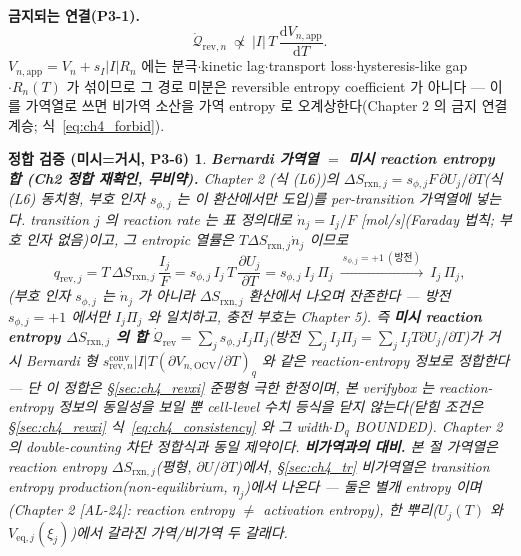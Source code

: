 \documentclass[11pt,a4paper]{article}
\newtheorem*{verifybox}{정합 검증 (미시=거시, P3-6)}
\newcommand{\dd}{\mathrm{d}}
\newcommand{\eq}{\mathrm{eq}}
\newcommand{\app}{\mathrm{app}}
\newcommand{\OCV}{\mathrm{OCV}}
\newcommand{\rev}{\mathrm{rev}}
\newcommand{\rxn}{\mathrm{rxn}}
\newcommand{\conv}{\mathrm{conv}}
\newcommand{\AL}[1]{\textsf{[AL-#1]}}
\begin{document}
\textbf{금지되는 연결(P3-1).}
\begin{equation}
\dot{\mathcal Q}_{\rev,n}\ \not\propto\ |I|\,T\,\frac{\dd V_{n,\app}}{\dd T}.
\label{eq:ch4_forbid}
\end{equation}
$V_{n,\app}=V_n+s_I|I|R_n$ 에는 분극$\cdot$kinetic lag$\cdot$transport loss$\cdot$hysteresis-like gap$\cdot R_n(T)$
가 섞이므로 그 경로 미분은 reversible entropy coefficient 가 아니다 — 이를 가역열로 쓰면 비가역 소산을 가역
entropy 로 오계상한다(Chapter 2 의 금지 연결 계승; 식~\eqref{eq:ch4_forbid}).

\begin{verifybox}
\textbf{Bernardi 가역열 $=$ 미시 reaction entropy 합 (Ch2 정합 재확인, 무비약).} Chapter 2 (식 (L6))의
$\Delta S_{\rxn,j}=s_{\phi,j}F\,\partial U_j/\partial T$(식 (L6) 동치형, 부호 인자 $s_{\phi,j}$ 는 이 환산에서만
도입)를 per-transition 가역열에 넣는다. transition $j$ 의 reaction rate 는 표 정의대로 $\dot n_j=I_j/F$
[mol/s](Faraday 법칙; 부호 인자 없음)이고, 그 entropic 열률은 $T\Delta S_{\rxn,j}\dot n_j$ 이므로
\begin{equation}
q_{\rev,j}=T\,\Delta S_{\rxn,j}\,\frac{I_j}{F}
=s_{\phi,j}\,I_j\,T\,\frac{\partial U_j}{\partial T}=s_{\phi,j}\,I_j\,\Pi_j
\ \xrightarrow{\ s_{\phi,j}=+1\ (\text{방전})\ }\ I_j\,\Pi_j,
\label{eq:ch4_qrev_micro}
\end{equation}
(부호 인자 $s_{\phi,j}$ 는 $\dot n_j$ 가 아니라 $\Delta S_{\rxn,j}$ 환산에서 나오며 \emph{잔존}한다 — 방전
$s_{\phi,j}=+1$ 에서만 $I_j\Pi_j$ 와 일치하고, 충전 부호는 Chapter 5). 즉 \textbf{미시 reaction entropy
$\Delta S_{\rxn,j}$ 의 합} $\dot{\mathcal Q}_{\rev}=\sum_j s_{\phi,j}I_j\Pi_j$(방전 $\sum_j I_j\Pi_j=\sum_j I_j
T\partial U_j/\partial T$)가 거시 Bernardi 형 $s_{\rev,n}^{\conv}|I|T(\partial V_{n,\OCV}/\partial T)_q$ 와 같은
\emph{reaction-entropy 정보}로 정합한다 — 단 이 정합은 \S\ref{sec:ch4_revxi} 준평형 극한 한정이며, 본 verifybox
는 reaction-entropy 정보의 \emph{동일성}을 보일 뿐 cell-level 수치 등식을 닫지 않는다(닫힘 조건은
\S\ref{sec:ch4_revxi} 식~\eqref{eq:ch4_consistency} 와 그 width$\cdot D_q$ BOUNDED). Chapter 2 의 double-counting
차단 정합식과 동일 제약이다. \textbf{비가역과의 대비.} 본 절 가역열은 \emph{reaction} entropy
$\Delta S_{\rxn,j}$(평형, $\partial U/\partial T$)에서, \S\ref{sec:ch4_tr} 비가역열은 transition entropy
production(non-equilibrium, $\eta_j$)에서 나온다 — 둘은 별개 entropy 이며(Chapter 2 \AL{24}: reaction entropy
$\ne$ activation entropy), 한 뿌리($U_j(T)$ 와 $V_{\eq,j}(\xi_j)$)에서 갈라진 가역/비가역 두 갈래다.
\end{verifybox}
\end{document}
